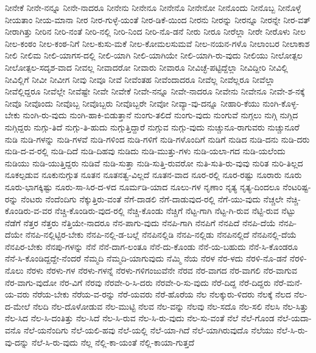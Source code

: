 {ನೀನೇಕೆ
ನೀನೇ-ನನ್ನೂ
ನೀನೇ-ನಾದರೂ
ನೀನೇನು
ನೀನೇನೂ
ನೀನೇನೊ
ನೀನೇನೋ
ನೀನೊಂದು
ನೀನೊಬ್ಬ
ನೀನೊಳ್ಳೆ
ನೀಯತಾಂ
ನೀಯ-ಮಾನಾ
ನೀರ
ನೀರ-ಗುಳ್ಳೆ-ಯಂತೆ
ನೀರ-ಡಿಕೆ-ಯಿಂದ
ನೀರನು
ನೀರನ್ನು
ನೀರನ್ನೂ
ನೀರನ್ನೇ
ನೀರ-ವತ್
ನೀರಾಗಿತ್ತು
ನೀರಿನ
ನೀರಿ-ನಂತೆ
ನೀರಿ-ನಲ್ಲಿ
ನೀರಿ-ನಿಂದ
ನೀರಿ-ನೊ-ಡನೆ
ನೀರು
ನೀರೂ
ನೀರೆಲ್ಲಾ
ನೀರೇ
ನೀರೊಳು
ನೀಲ
ನೀಲ-ಕಂಠಂ
ನೀಲ-ಕಂಠ-ನಿಗೆ
ನೀಲ-ಕುಸು-ಮಕೆ
ನೀಲ-ಕೋಮಲಸುಮವೆ
ನೀಲ-ನಯನ-ಗಳೊ
ನೀಲಾಂಬರ
ನೀಲಾಕಾಶ
ನೀಲಿ
ನೀಲಿಮ
ನೀಲಿ-ಯಾಗಸ-ದಲ್ಲಿ
ನೀಲಿ-ಯಾಗಿ
ನೀಲಿ-ಯಾಗಿಯೇ
ನೀಲಿ-ಯಾಗಿ-ರು-ವುದು
ನೀಲಿಯು
ನೀಲೋತ್ಪಲ
ನೀಲೋತ್ಪಲ-ಸದೃಶ-ವಾದ
ನೀವಲ್ಲ
ನೀವಾದರೋ
ನೀವಾರು
ನೀವಾರೂ
ನೀವಿಚ್ಛೆ-ಪಟ್ಟಿದ್ದೆಲ್ಲಾ
ನೀವಿದ್ದೀರಿ
ನೀವಿಲ್ಲಿ
ನೀವಿಲ್ಲಿಗೆ
ನೀವೀ
ನೀವೀಗ
ನೀವು
ನೀವೂ
ನೀವೆ
ನೀವೆಂತಹ
ನೀವೆಂದಾದರೂ
ನೀವೆಲ್ಲ
ನೀವೆಲ್ಲರೂ
ನೀವೆಲ್ಲಾ
ನೀವೆಲ್ಲಿದ್ದರೂ
ನೀವೆಲ್ಲೇ
ನೀವೆಷ್ಟೇ
ನೀವೇ
ನೀವೇಕೆ
ನೀವೇ-ನನ್ನೂ
ನೀವೇ-ನಾದರೂ
ನೀವೇನು
ನೀವೇನೂ
ನೀವೇ-ಶ-ನಕ್ಕೆ
ನೀವೊ
ನೀವೊಂದು
ನೀವೊಬ್ಬ
ನೀವೊಬ್ಬರು
ನೀವೊಬ್ಬರೇ
ನೀವೋ
ನೀವ್ಯಾ-ವು-ದನ್ನೂ
ನೀಹಾರಿ-ಕೆಯು
ನುಂಗಿ-ಕೊಳ್ಳ-ಬೇಕು
ನುಂಗಿ-ರು-ವುದು
ನುಂಗಿ-ಹಾಕಿ-ಬಿಡುತ್ತಾನೆ
ನುಂಗು-ತಲಿದೆ
ನುಂಗು-ವುದು
ನುಂಗುವೆ
ನುಗ್ಗಲು
ನುಗ್ಗಿ
ನುಗ್ಗಿದ
ನುಗ್ಗಿದ್ದರು
ನುಗ್ಗು-ತಿದೆ
ನುಗ್ಗು-ತಿ-ಹುದು
ನುಗ್ಗುತ್ತಿದ್ದಾರೆ
ನುಗ್ಗುವ
ನುಗ್ಗು-ವುದು
ನುಚ್ಚುನೂ-ರಾಗುವರು
ನುಚ್ಚುನೂರೆ
ನುಡಿ
ನುಡಿ-ಗಳನ್ನು
ನುಡಿ-ಗಳವೆ
ನುಡಿ-ಗಳಿಂದ
ನುಡಿ-ಗಳಿಗೆ
ನುಡಿ-ಗಳೊಂದಿಗೆ
ನುಡಿಗೆ
ನುಡಿದ
ನುಡಿ-ದನು
ನುಡಿ-ದರು
ನುಡಿ-ದ-ವ-ರಲ್ಲಿ
ನುಡಿ-ದಿದೆ
ನುಡಿ-ದಿಹವು
ನುಡಿದು
ನುಡಿ-ಮುತ್ತು-ಗಳು
ನುಡಿ-ಯಲಾ-ಗದ
ನುಡಿ-ಯಲೆಂದು
ನುಡಿಯು
ನುಡಿ-ಯುತ್ತಿದ್ದರು
ನುಡಿವೆ
ನುಡಿ-ಸುತ್ತಾ
ನುಡಿ-ಸುತ್ತಿ-ರುವರೋ
ನುತಿ-ಸುತಿ-ರು-ವುವು
ನುರಿತ
ನುರಿ-ತಿಲ್ಲದ
ನೂಕಲ್ಪಡುವ
ನೂಕುನುಗ್ಗುತ
ನೂತನ
ನೂತನತ್ವ-ವಿಲ್ಲದೆ
ನೂತನ-ವಾದ
ನೂರ-ರಲ್ಲಿ
ನೂರ-ರಷ್ಟು
ನೂರಾರು
ನೂರು
ನೂರು-ಭಾಗಕ್ಕಿಷ್ಟು
ನೂರು-ಸಾ-ಸಿರ-ದ-ಳದ
ನೂರ್ಮಡಿ-ಯಾದ
ನೂಲು-ಗಳ
ನೃಣಾಂ
ನೃತ್ಯ
ನೃತ್ಯ-ದಿಂದಲೂ
ನೆಂಟರಿಷ್ಟ-ರನ್ನು
ನೆಂಟರು
ನೆಂದೆಂದಿಗು
ನೆಕ್ಕುತ್ತಿರು-ವಂತೆ
ನೆಗೆ-ದಾಡಲಿ
ನೆಗೆ-ದಾಡುವುದ-ರಲ್ಲಿ
ನೆಗೆ-ಯು-ವುದು
ನೆಚ್ಚಲೇ
ನೆಚ್ಚಿ-ಕೊಂಡಿರು-ವ-ವರ
ನೆಚ್ಚಿ-ಕೊಂಡಿರು-ವುದ-ರಲ್ಲಿ
ನೆಚ್ಚಿ-ಕೊಂಡು
ನೆಚ್ಚಿಗೆ
ನೆಟ್ಟ-ಗಾಗಿ
ನೆಟ್ಟ-ಗಿ-ರುವ
ನೆಟ್ಟಿ-ರುವ
ನೆಟ್ಟು
ನೆಡೆಗೆ
ನೆತ್ತರ
ನೆತ್ತರು
ನೆತ್ತಿಯೇ-ನಾದರೂ
ನೆನ-ಪಾಗು-ವುದು
ನೆನಪಿ-ಗಾಗಿ
ನೆನಪಿಗೆ
ನೆನಪಿದೆ
ನೆನಪಿ-ದೆಯೆ
ನೆನಪಿ-ದೆಯೇ
ನೆನಪಿ-ನಲ್ಲಿಟ್ಟಿರ-ಬೇಕು
ನೆನಪಿ-ನಲ್ಲಿ-ಡ-ಬಲ್ಲೆ
ನೆನಪಿನಲ್ಲಿಡಿ
ನೆನಪಿ-ನಲ್ಲಿಡು
ನೆನಪಿನಲ್ಲಿದೆ
ನೆನಪಿನಲ್ಲಿ-ದೆಯೆ
ನೆನಪಿರ-ಬೇಕು
ನೆನಪು-ಗಳನ್ನು
ನೆನೆ
ನೆನೆ-ದಾಗ-ಲಂತೂ
ನೆನೆ-ದು-ಕೊಂಡು
ನೆನೆ-ಯ-ಬಹುದು
ನೆನೆ-ಸಿ-ಕೊಂಡರೂ
ನೆನೆ-ಸಿ-ಕೊಂಡಿದ್ದದ್ದೇ-ನೆಂದರೆ
ನೆಮ್ಮದಿ
ನೆಮ್ಮದಿ-ಯಾಗುವುದು
ನೆಮ್ಮಿ
ನೆಯ
ನೆರಳ
ನೆರ-ಳದು
ನೆರಳಿ-ನೊ-ಡನೆ
ನೆರಳಿ-ನೊಲು
ನೆರಳು
ನೆರಳು-ಗಳ
ನೆರಳು-ಗಳನ್ನೆ
ನೆರಳು-ಗಳಿಗಂಜುವೆನೇ
ನೆರವ
ನೆರ-ವಾಗದ
ನೆರ-ವಾಗಲಿ
ನೆರ-ವಾಗುವ
ನೆರ-ವಾಗು-ವುದೋ
ನೆರ-ವಿಗೆ
ನೆರವು
ನೆರವೇ-ರಿ-ಸಿ-ದರು
ನೆರವೇ-ರಿ-ಸು-ವುದು
ನೆರೆ-ದಿದ್ದ
ನೆರೆ-ದಿದ್ದರು
ನೆರೆ-ಮನೆ-ಯ-ವರು
ನೆರೆಯ-ಬೇಕು
ನೆರೆಯ-ವ-ರನ್ನು
ನೆರೆ-ಯವರು
ನೆರೆ-ಹೊರೆಯ
ನೆಲ
ನೆಲಕ್ಕುರು-ಳಿದರು
ನೆಲಕ್ಕೆ
ನೆಲದ
ನೆಲ-ದ-ಮೇಲೆ
ನೆಲದಿ
ನೆಲ-ದೊಳೋಡುವ
ನೆಲ-ಮುಟ್ಟಿ
ನೆಲವ
ನೆಲ-ವನ್ನು
ನೆಲವು
ನೆಲ-ಸದೊ
ನೆಲ-ಸಲಿ
ನೆಲಸಿ
ನೆಲ-ಸಿತ್ತು
ನೆಲ-ಸಿದ
ನೆಲ-ಸಿ-ದಂತಿತ್ತು
ನೆಲ-ಸಿದೆ
ನೆಲ-ಸಿ-ರುವ
ನೆಲ-ಸಿ-ರು-ವುದು
ನೆಲ-ಸು-ವಂತೆ
ನೆಲೆ
ನೆಲೆ-ಗೊಂಡ
ನೆಲೆ-ಯದಾ-ವನೊ
ನೆಲೆ-ಯನೆಂದಿಗು
ನೆಲೆ-ಯಲಿ-ಹವು
ನೆಲೆ-ಯಲ್ಲಿ
ನೆಲೆ-ಯಾ-ಗಿದೆ
ನೆಲೆ-ಯಾಗಿರುವುದೊ
ನೆಲೆಯು
ನೆಲೆ-ಸಿ-ರು-ವು-ದನ್ನು
ನೆಲೆ-ಸಿ-ರು-ವುದು
ನೆಲ್ಲ
ನೆಲ್ಲಿ-ಕಾ-ಯಂತೆ
ನೆಲ್ಲಿ-ಕಾಯಾ-ಗುತ್ತದೆ
}
